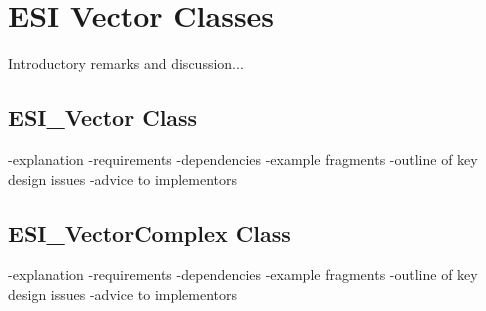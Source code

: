 \chapter{ESI Vector Classes}

Introductory remarks and discussion...

\section{ESI\_Vector Class}

-explanation
-requirements
-dependencies
-example fragments
-outline of key design issues
-advice to implementors

\section{ESI\_VectorComplex Class}

-explanation
-requirements
-dependencies
-example fragments
-outline of key design issues
-advice to implementors
